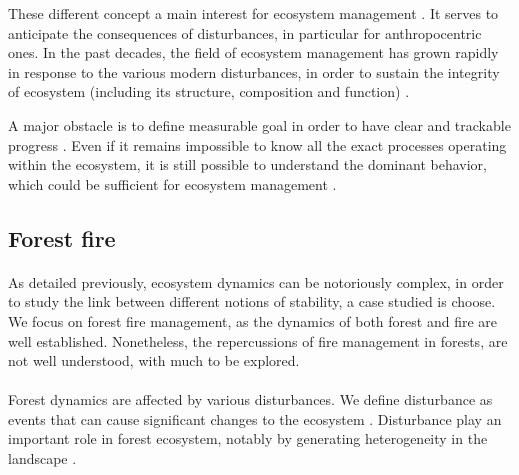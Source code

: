 \documentclass{article}
\begin{document}
These different concept a main interest for ecosystem management \cite{mumby_ecological_2014}. It serves to anticipate the consequences of disturbances, in particular for anthropocentric ones. In the past decades, the field of ecosystem management has grown rapidly \cite{grumbine_reflections_1997} in response to the various modern disturbances, in order to sustain the integrity of ecosystem (including its structure, composition and function) \cite{jensen1994overview}. 

A major obstacle is to define measurable goal in order to have clear and trackable progress \cite{slocombe_forum:_1998}.
Even if it remains impossible to know all the exact processes operating within the ecosystem, it is still possible to understand the dominant behavior, which could be sufficient for ecosystem management \cite{mori_ecosystem_2011} \cite{slocombe_forum:_1998} \cite{stanley_ecosystem_1995}.







\subsection*{Forest fire}

\paragraph{}
As detailed previously, ecosystem  dynamics  can  be  notoriously  complex, in order to study the link between different notions of stability, a case studied is choose. 
We focus on forest fire management, as the dynamics of both forest and fire are well established. Nonetheless, the repercussions of fire management in forests, are not well understood, with much to be explored.


\paragraph{}

Forest dynamics are affected by various disturbances. We define disturbance as events that can cause significant changes to the ecosystem \cite{white1985natural} \cite{rykiel_towards_1985} . Disturbance play an important role in forest ecosystem, notably by generating heterogeneity in the landscape \cite{turner2010disturbance}.
\end{document}
